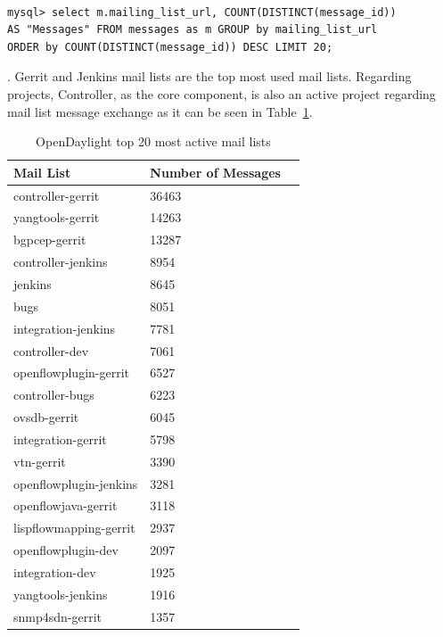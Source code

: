 \documentclass[a4paper, 12pt]{book}
\begin{document}
\begin{verbatim}

mysql> select m.mailing_list_url, COUNT(DISTINCT(message_id))
AS "Messages" FROM messages as m GROUP by mailing_list_url
ORDER by COUNT(DISTINCT(message_id)) DESC LIMIT 20;

\end{verbatim}
. Gerrit and Jenkins mail lists are the top most used mail lists. Regarding projects, Controller, as the core component, is also an active project regarding mail list message exchange as it can be seen in Table~\ref{tab:odl_top_maillists}.
\begin{table}
\footnotesize
\begin{center}
\begin{tabular}{|l|l|p{3cm}|}
\hline
\textbf{Mail List} & \textbf{Number of Messages} \\ \hline
controller-gerrit & 36463 \\ \hline
yangtools-gerrit & 14263 \\ \hline
bgpcep-gerrit & 13287 \\ \hline
controller-jenkins & 8954 \\ \hline
jenkins & 8645 \\ \hline
bugs & 8051 \\ \hline
integration-jenkins & 7781 \\ \hline
controller-dev & 7061 \\ \hline
openflowplugin-gerrit & 6527 \\ \hline
controller-bugs & 6223 \\ \hline
ovsdb-gerrit & 6045 \\ \hline
integration-gerrit & 5798 \\ \hline
vtn-gerrit & 3390 \\ \hline
openflowplugin-jenkins & 3281 \\ \hline
openflowjava-gerrit & 3118 \\ \hline
lispflowmapping-gerrit & 2937 \\ \hline
openflowplugin-dev & 2097 \\ \hline
integration-dev & 1925 \\ \hline
yangtools-jenkins & 1916 \\ \hline
snmp4sdn-gerrit & 1357 \\ \hline
\end{tabular}
\end{center}
\caption{OpenDaylight top 20 most active mail lists}
\label{tab:odl_top_maillists}
\end{table}
\end{document}
